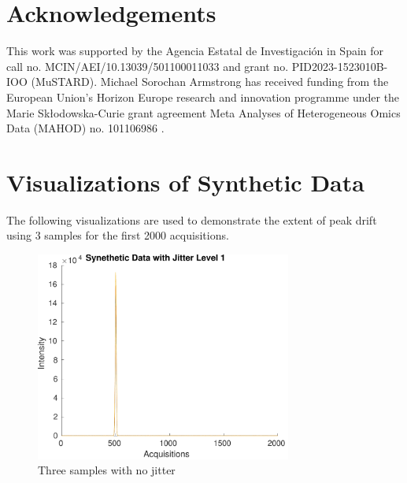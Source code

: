 \documentclass[preprint,12pt]{elsarticle}
\begin{document}
\section{Acknowledgements}

This work was supported by the Agencia Estatal de Investigación in Spain for call no. MCIN/AEI/10.13039/501100011033 and grant no. PID2023-1523010B-IOO (MuSTARD). Michael Sorochan Armstrong has received funding from the European Union's Horizon Europe research and innovation programme under the Marie Skłodowska-Curie grant agreement Meta Analyses of Heterogeneous Omics Data (MAHOD) no. 101106986 .




\appendix

\section{Visualizations of Synthetic Data}\label{sec:vis}

The following visualizations are used to demonstrate the extent of peak drift using 3 samples for the first 2000 acquisitions.

\begin{figure}[h]
    \centering
    \includegraphics[width=0.75\textwidth]{figures/jitter_illustration1.pdf}
    \caption{Three samples with no jitter}
    \label{fig:afigure1}
\end{figure}
\end{document}
